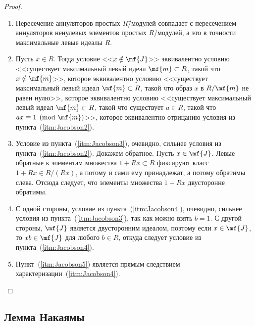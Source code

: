 \documentclass[
	extrafontsizes,
	11pt,
	hyphens,
]{memoir}
\begin{document}
\begin{proof}
~\begin{enumerate}[
	font=\upshape,
	label=\asbuk*),
	ref=\asbuk*,
	]
\item
Пересечение аннуляторов простых \(R\)\=/модулей совпадает с пересечением аннуляторов ненулевых элементов простых \(R\)\=/модулей, а это в точности максимальные левые идеалы \(R\).

\item
Пусть \(x \in R\). Тогда условие <<\(x \notin \mf{J}\)>> эквивалентно условию <<существует максимальный левый идеал \(\mf{m} \subset R\), такой что \(x \notin \mf{m}\)>>, которое эквивалентно условию <<существует максимальный левый идеал \(\mf{m} \subset R\), такой что образ \(x\) в \(R/\mf{m}\) не равен нулю>>, которое эквивалентно условию <<существует максимальный левый идеал \(\mf{m} \subset R\), такой что существует \(a \in R\), такой что \(ax \equiv 1 \pmod{\mf{m}}\)>>, которое эквивалентно отрицанию условия из пункта~(\ref{itm:Jacobson2}).

\item
Условие из пункта~(\ref{itm:Jacobson3}), очевидно, сильнее условия из пункта~(\ref{itm:Jacobson2}). Докажем обратное.
Пусть \(x \in \mf{J}\). Левые обратные к элементам множества \(1 + Rx \subset R\) фиксируют класс \(1 + Rx \in R / (Rx)\), а потому и сами ему принадлежат, а потому обратимы слева. Отсюда следует, что элементы множества \(1 + Rx\) двусторонне обратимы.

\item
С одной стороны, условие из пункта~(\ref{itm:Jacobson4}), очевидно, сильнее условия из пункта~(\ref{itm:Jacobson3}), так как можно взять \(b=1\).
С другой стороны, \(\mf{J}\) является двусторонним идеалом, поэтому если \(x \in \mf{J}\), то \(xb \in \mf{J}\) для любого \(b \in R\), откуда следует условие из пункта~(\ref{itm:Jacobson4}).

\item
Пункт~(\ref{itm:Jacobson5}) является прямым следствием характеризации~(\ref{itm:Jacobson4}).
\qedhere
\end{enumerate}
\end{proof}

\subsection{Лемма Накаямы}
\end{document}
